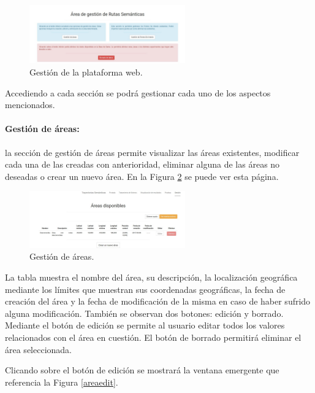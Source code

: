 \begin{figure}[h]
  \centering
    \includegraphics[width=0.6\textwidth]{../img/manualusuario/manage.jpg}
  \caption{Gestión de la plataforma web.}
  \label{manage}
\end{figure}

Accediendo a cada sección se podrá gestionar cada uno de los aspectos mencionados.

\paragraph{Gestión de áreas:} la sección de gestión de áreas permite visualizar las áreas existentes, modificar cada una de las creadas con anterioridad, eliminar alguna de las áreas no deseadas o crear un nuevo área. En la Figura \ref{areamanage1} se puede ver esta página.

\begin{figure}[h]
  \centering
    \includegraphics[width=0.6\textwidth]{../img/manualusuario/areamanage1.jpg}
  \caption{Gestión de áreas.}
  \label{areamanage1}
\end{figure}
 
La tabla muestra el nombre del área, su descripción, la localización geográfica mediante los límites que muestran sus coordenadas geográficas, la fecha de creación del área y la fecha de modificación de la misma en caso de haber sufrido alguna modificación. También se observan dos botones: edición y borrado. Mediante el botón de edición se permite al usuario editar todos los valores relacionados con el área en cuestión. El botón de borrado permitirá eliminar el área seleccionada.

Clicando sobre el botón de edición se mostrará la ventana emergente que referencia la Figura \ref{areaedit}. 

